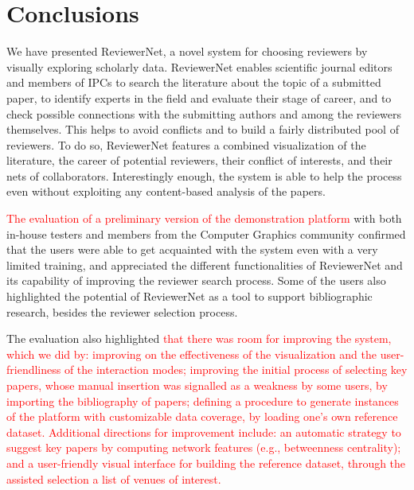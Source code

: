 
\chapter{Conclusions}
\label{sec:conclusions}

We have presented ReviewerNet, a novel system for choosing reviewers by visually exploring scholarly data. ReviewerNet enables scientific journal editors and members of IPCs to search the literature about the topic of a submitted paper, to identify experts in the field and evaluate their stage of career, and to check possible connections with the submitting authors and among the reviewers themselves. This helps to avoid conflicts and to build a fairly distributed pool of reviewers. To do so, ReviewerNet features a combined visualization of the literature, the career of potential reviewers, their conflict of interests, and their nets of collaborators. Interestingly enough, the system is able to help the process even without exploiting any content-based analysis of the papers.


\textcolor{red}{The evaluation of a preliminary version of the demonstration platform} with both in-house testers and members from the Computer Graphics community confirmed that the users were able to get acquainted with the system even with a very limited training, and  appreciated the different functionalities of ReviewerNet and its capability of improving the reviewer search process.  
Some of the users also highlighted the potential of ReviewerNet as a tool to support bibliographic research, besides the reviewer selection process. 

The evaluation also highlighted \textcolor{red}{that there was room for improving the system, which we did by: improving on the effectiveness of the visualization and the user-friendliness of the interaction modes; improving the initial process of selecting key papers, whose manual insertion was signalled as a weakness by some users, by importing the bibliography of papers; defining a procedure to generate instances of the platform with customizable data coverage, by loading one's own reference dataset. Additional directions for improvement include: an automatic strategy to suggest key papers by computing network features (e.g., betweenness  centrality); and a user-friendly visual interface for building the reference dataset, through the assisted selection a list of venues of interest.}    

